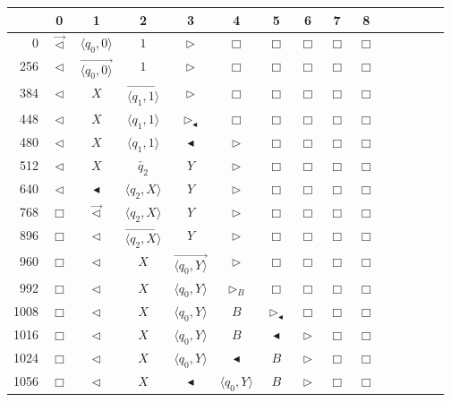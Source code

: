 \documentclass[pre,amssymb,showpacs,showkeys,preprint]{revtex4}
\begin{document}
\begin{figure}
\begin{center}
\normalsize{
\renewcommand{\arraystretch}{0.9}
\begin{tabular}{r|cccccccccccccc}
   &0 &1 & 2 & 3 & 4 & 5 & 6 & 7 & 8 \\ \hline
0 & $\overrightarrow{\lhd}$ & $\langle q_0,0 \rangle$ & $1$ & $\rhd$ & $\Box$ & $\Box$ & $\Box$ & $\Box$ & $\Box$ \\
256 & $\lhd$ & $\overrightarrow{\langle q_0,0 \rangle}$ & $1$ & $\rhd$ & $\Box$ & $\Box$ & $\Box$ & $\Box$ & $\Box$ \\
384 & $\lhd$ & $X$ & $\overrightarrow{\langle q_1,1 \rangle}$ & $\rhd$ & $\Box$ & $\Box$ & $\Box$ & $\Box$ & $\Box$ \\
448 & $\lhd$ & $X$ & $\langle q_1,1 \rangle$ & $\rhd_\blacktriangleleft$ & $\Box$ & $\Box$ & $\Box$ & $\Box$ & $\Box$ \\
480 & $\lhd$ & $X$ & $\langle q_1,1 \rangle$ & $\blacktriangleleft$ & $\rhd$ & $\Box$ & $\Box$ & $\Box$ & $\Box$ \\
512 & $\lhd$ & $X$ & $\overleftarrow{q_2}$ & $Y$ & $\rhd$ & $\Box$ & $\Box$ & $\Box$ & $\Box$ \\
640 & $\lhd$ & $\blacktriangleleft$ & $\langle q_2,X \rangle$ & $Y$ & $\rhd$ & $\Box$ & $\Box$ & $\Box$ & $\Box$ \\
768 & $\Box$ & $\overrightarrow{\lhd}$ & $\langle q_2,X \rangle$ & $Y$ & $\rhd$ & $\Box$ & $\Box$ & $\Box$ & $\Box$ \\
896 & $\Box$ & $\lhd$ & $\overrightarrow{\langle q_2,X \rangle}$ & $Y$ & $\rhd$ & $\Box$ & $\Box$ & $\Box$ & $\Box$ \\
960 & $\Box$ & $\lhd$ & $X$ & $\overrightarrow{\langle q_0,Y \rangle}$ & $\rhd$ & $\Box$ & $\Box$ & $\Box$ & $\Box$ \\
992 & $\Box$ & $\lhd$ & $X$ & $\langle q_0,Y \rangle$ & $\rhd_B$ & $\Box$ & $\Box$ & $\Box$ & $\Box$ \\
1008 & $\Box$ & $\lhd$ & $X$ & $\langle q_0,Y \rangle$ & $B$ & $\rhd_\blacktriangleleft$ & $\Box$ & $\Box$ & $\Box$ \\
1016 & $\Box$ & $\lhd$ & $X$ & $\langle q_0,Y \rangle$ & $B$ & $\blacktriangleleft$ & $\rhd$ & $\Box$ & $\Box$ \\
1024 & $\Box$ & $\lhd$ & $X$ & $\langle q_0,Y \rangle$ & $\blacktriangleleft$ & $B$ & $\rhd$ & $\Box$ & $\Box$ \\
1056 & $\Box$ & $\lhd$ & $X$ & $\blacktriangleleft$ & $\langle q_0,Y \rangle$ & $B$ & $\rhd$ & $\Box$ & $\Box$ \\

\end{tabular}}
\end{center}
\end{figure}
\end{document}

